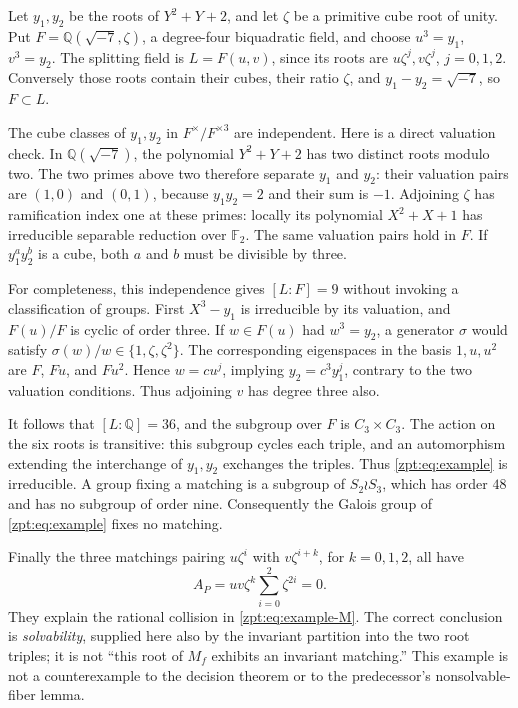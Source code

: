 \documentclass[11pt,letterpaper]{article}
\numberwithin{equation}{section}
\theoremstyle{definition}
\theoremstyle{remark}
\newcommand{\QQ}{\mathbb Q}
\begin{document}
Let $y_1,y_2$ be the roots of $Y^2+Y+2$, and let $\zeta$ be a primitive
cube root of unity. Put $F=\QQ(\sqrt{-7},\zeta)$, a degree-four biquadratic
field, and choose $u^3=y_1$, $v^3=y_2$. The splitting field is
$L=F(u,v)$, since its roots are $u\zeta^j,v\zeta^j$, $j=0,1,2$.
Conversely those roots contain their cubes, their ratio $\zeta$, and
$y_1-y_2=\sqrt{-7}$, so $F\subset L$.

The cube classes of $y_1,y_2$ in $F^\times/F^{\times3}$ are independent.
Here is a direct valuation check. In $\QQ(\sqrt{-7})$, the polynomial
$Y^2+Y+2$ has two distinct roots modulo two. The two primes above two
therefore separate $y_1$ and $y_2$: their valuation pairs are $(1,0)$
and $(0,1)$, because $y_1y_2=2$ and their sum is $-1$. Adjoining $\zeta$
has ramification index one at these primes: locally its polynomial
$X^2+X+1$ has irreducible separable reduction over $\mathbb F_2$.
The same valuation pairs hold in $F$. If $y_1^a y_2^b$ is a cube, both
$a$ and $b$ must be divisible by three.

For completeness, this independence gives $[L:F]=9$ without invoking a
classification of groups. First $X^3-y_1$ is irreducible by its valuation,
and $F(u)/F$ is cyclic of order three. If $w\in F(u)$ had $w^3=y_2$,
a generator $\sigma$ would satisfy $\sigma(w)/w\in\{1,\zeta,\zeta^2\}$.
The corresponding eigenspaces in the basis $1,u,u^2$ are $F$, $Fu$, and
$Fu^2$. Hence $w=cu^j$, implying $y_2=c^3y_1^j$, contrary to the two
valuation conditions. Thus adjoining $v$ has degree three also.

It follows that $[L:\QQ]=36$, and the subgroup over $F$ is
$C_3\times C_3$. The action on the six roots is transitive: this subgroup
cycles each triple, and an automorphism extending the interchange of
$y_1,y_2$ exchanges the triples. Thus \eqref{zpt:eq:example} is irreducible.
A group fixing a matching is a subgroup of $S_2\wr S_3$, which has order
$48$ and has no subgroup of order nine. Consequently the Galois group of
\eqref{zpt:eq:example} fixes no matching.

Finally the three matchings pairing $u\zeta^i$ with $v\zeta^{i+k}$,
for $k=0,1,2$, all have
\[
 A_P=uv\zeta^k\sum_{i=0}^2\zeta^{2i}=0.
\]
They explain the rational collision in \eqref{zpt:eq:example-M}. The correct
conclusion is \emph{solvability}, supplied here also by the invariant
partition into the two root triples; it is not ``this root of $M_f$
exhibits an invariant matching.'' This example is not a counterexample
to the decision theorem or to the predecessor's nonsolvable-fiber lemma.
\end{document}

